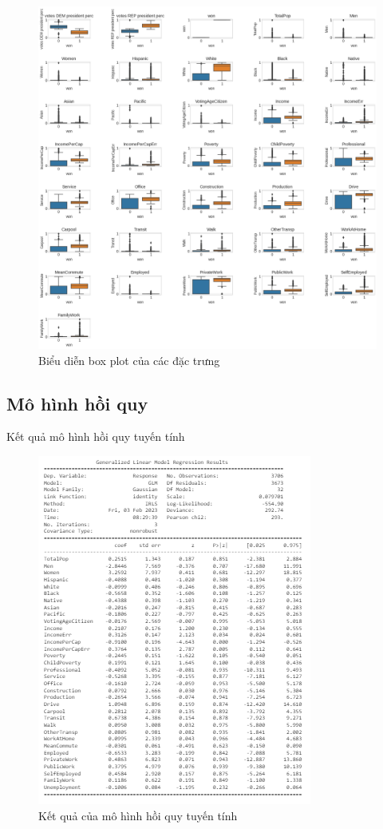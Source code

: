 \documentclass[10pt]{beamer}
\theoremstyle{remark}
\theoremstyle{definition}
\begin{document}
\begin{frame}
    \begin{figure}[h!]
        \centering
        \includegraphics[height=0.85\textheight]{figures/Box_plot.png}
        \caption{Biểu diễn box plot của các đặc trưng}
    \end{figure}
\end{frame}

\subsection{Mô hình hồi quy}

\begin{frame}{Kết quả mô hình hồi quy tuyến tính}
	\begin{figure}[h!]
        \centering
        \includegraphics[height=0.75\textheight]{figures/GLM_Result.png}
        \caption{Kết quả của mô hình hồi quy tuyến tính}
    \end{figure}
\end{frame}
\end{document}
